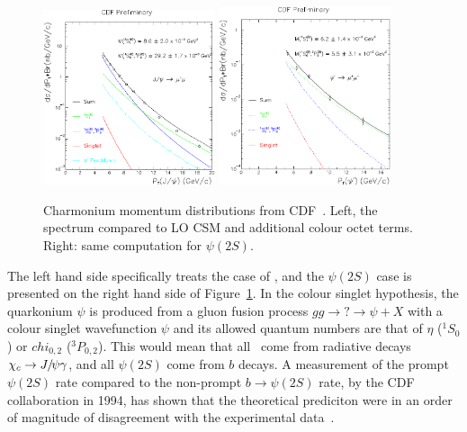 \begin{figure}
\begin{center}
  \includegraphics[width=0.45\textwidth]{Chapters/pQuarkonia/CDFpsi1S.pdf}
  \includegraphics[width=0.45\textwidth]{Chapters/pQuarkonia/CDFpsi2S.pdf}
  \caption{Charmonium momentum distributions from
    CDF~\cite{CDFpsi}. Left, the \Jpsi spectrum compared to LO CSM and
    additional colour octet terms. Right: same computation for
    $\psi(2S)$.}
  \label{fig:CDF_CSM}
\end{center}
\end{figure}

 The left hand side specifically treats the
case of \Jpsi, and the $\psi(2S)$ case is presented on the right hand
side of
Figure~\ref{fig:CDF_CSM}. In the colour singlet hypothesis,
the quarkonium $\psi$ is produced from a gluon fusion process $gg \to ? \to \psi +
X$ with a colour singlet  wavefunction $\psi$ and its
allowed quantum numbers are that of $\eta$ ($^{1}S_{0}$) or
$chi_{0,2}$ ($^{3}P_{0,2}$). This would mean that all \Jpsi\ come from
radiative decays $\chi_{c} \to J\hspace{-.08em}/\hspace{-.14em}\psi\gamma$, and all $\psi(2S)$ come
from $b$ decays. A measurement of the prompt $\psi(2S)$ rate compared
to the non-prompt $b \to \psi(2S)$ rate, by the CDF collaboration in 1994, has shown
that the theoretical prediciton were in an order of magnitude of
disagreement with the experimental data~\cite{CDF:1994aa}.

